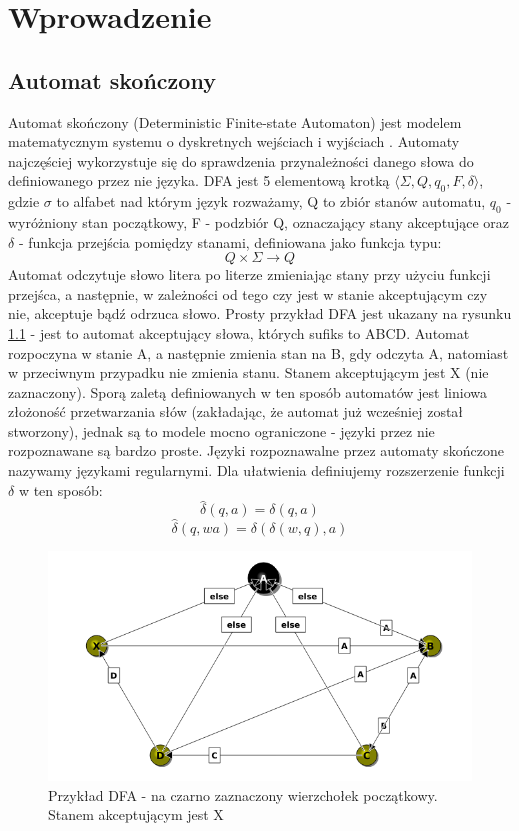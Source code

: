 \documentclass[declaration,shortabstract]{iithesis}
\author         {Bartłomiej Najdecki}
\date          {30 czerwca 2017}                     %
\theoremstyle{definition}
\theoremstyle{plain}
\begin{document}

\chapter{Wprowadzenie}
\section{Automat skończony}
Automat skończony (Deterministic Finite-state Automaton) jest modelem matematycznym systemu o dyskretnych wejściach i wyjściach \cite{Wprowadzenie do teorii}. Automaty najczęściej wykorzystuje się do sprawdzenia przynależności danego słowa do definiowanego przez nie języka. DFA jest 5 elementową krotką \(\langle \Sigma, Q,  q_0, F, \delta \rangle \), gdzie \(\sigma\) to alfabet nad którym język rozważamy, Q to zbiór stanów automatu, \(q_0\) - wyróżniony stan początkowy, F - podzbiór Q, oznaczający stany akceptujące oraz \(\delta\) - funkcja przejścia pomiędzy stanami, definiowana jako funkcja typu: 
$$ Q \times \Sigma \rightarrow Q$$
Automat odczytuje słowo litera po literze zmieniając stany przy użyciu funkcji przejśca, a następnie, w zależności od tego czy jest w stanie akceptującym czy nie, akceptuje bądź odrzuca słowo. Prosty przykład DFA jest ukazany na rysunku \ref{fig:obrazek DFA} - jest to automat akceptujący słowa, których sufiks to ABCD. Automat rozpoczyna w stanie A, a następnie zmienia stan na B, gdy odczyta A, natomiast w przeciwnym przypadku nie zmienia stanu. Stanem akceptującym jest X (nie zaznaczony). Sporą zaletą definiowanych w ten sposób automatów jest liniowa złożoność przetwarzania słów (zakładając, że automat już wcześniej został stworzony), jednak są to modele mocno ograniczone - języki przez nie rozpoznawane są bardzo proste. Języki rozpoznawalne przez automaty skończone nazywamy językami regularnymi.
Dla ułatwienia definiujemy rozszerzenie funkcji \(\delta\) w ten sposób:
$$ \hat\delta(q, a) = \delta(q, a) $$
$$ \hat\delta(q, wa) = \delta(\delta(w, q), a) $$
\begin{figure}
\centering
\includegraphics[width=\textwidth]{fsm.png}
\caption[caption]{Przykład DFA - na czarno zaznaczony wierzchołek początkowy.\\\hspace{\textwidth}Stanem akceptującym jest X}
\label{fig:obrazek DFA}
\end{figure}
\end{document}
